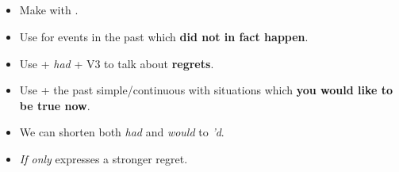 \subsection{}
\begin{itemize}
    \item[\doot] Make with .
    \item[\doot] Use for events in the past which \textbf{did not in fact happen}.
    \item[\doot] Use  + \textit{had} + V3 to talk about \textbf{regrets}.
    \item[\doot] Use  + the past simple/continuous with situations
    which \textbf{you would like to be true now}.
    \item[\aast] We can shorten both \textit{had} and \textit{would} to \textit{'d}.
    \item[\aast] \textit{If only} expresses a stronger regret.
\end{itemize}

\subsection{}
\begin{itemize}
\end{itemize}